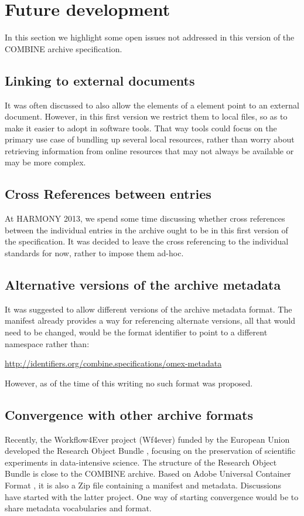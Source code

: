 
\section{Future development}
\label{future}
In this section we highlight some open issues not addressed in this 
version of the COMBINE archive specification. 


\subsection{Linking to external documents}
It was often discussed to also allow the  elements of a 
\Content element point to an external document. However, in this first 
version we restrict them to local files, so as to make it easier to 
adopt in software tools. That way tools could focus on the primary use 
case of bundling up several local resources, rather than worry about 
retrieving information from online resources that may not always be 
available or may be more complex.

\subsection{Cross References between entries}
At HARMONY 2013, we spend some time discussing whether cross references 
between the individual entries in the archive ought to be in this first 
version of the specification. It was decided to leave the cross 
referencing to the individual standards for now, rather to impose them 
ad-hoc. 

\subsection{Alternative versions of the archive metadata}
It was suggested to allow different versions of the archive metadata 
format. The manifest already provides a way for referencing alternate 
versions, all that would need to be changed, would be the format 
identifier to point to a different namespace rather than: 


\url{http://identifiers.org/combine.specifications/omex-metadata}

However, as of the time of this writing no such format was proposed.

\subsection{Convergence with other archive formats}
Recently, the Workflow4Ever project (Wf4ever) funded by the European Union 
developed the Research Object Bundle \cite{ro2013}, focusing on the preservation
of scientific experiments in data-intensive science. The structure of the 
Research Object Bundle is close to the COMBINE archive. Based on Adobe 
Universal Container Format \cite{ucf}, it is also a Zip file containing 
a manifest and metadata. Discussions have started with the latter project. 
One way of starting convergence would be to share metadata vocabularies and format. 


